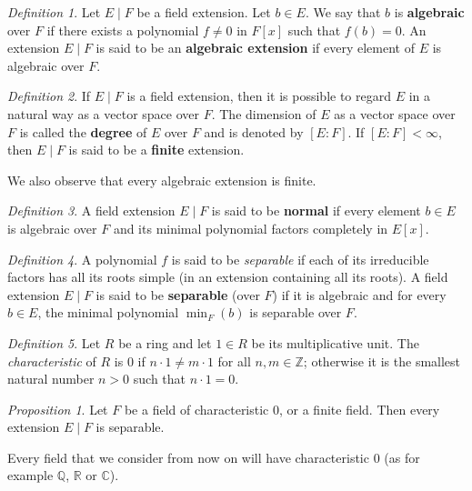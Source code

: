 \documentclass[11pt]{article}
\theoremstyle{plain}
\theoremstyle{definition}
\theoremstyle{remark}
\newtheorem*{definition*}{Definition}
\newtheorem*{proposition*}{Proposition}
\newcommand{\C}{\mathbb{C}}
\newcommand{\R}{\mathbb{R}}
\newcommand{\Q}{\mathbb{Q}}
\newcommand{\Z}{\mathbb{Z}}
\begin{document}
\begin{definition*}
Let $E\mid F$ be a field extension. Let $b \in E$. We say that $b$ is
\textbf{algebraic} over $F$ if there exists a polynomial $f \neq 0$ in
$F[x]$ such that $f(b) = 0$. An extension $E\mid F$ is said to be an
\textbf{algebraic extension} if every element of $E$ is algebraic over
$F$.
\end{definition*}

\begin{definition*}
If $E\mid F$ is a field extension, then it is possible to regard $E$ in
a natural way as a vector space over $F$. The dimension of $E$ as a
vector space over $F$ is called the \textbf{degree} of $E$ over $F$ and
is denoted by $[E : F]$. If $[E : F] < \infty$, then $E\mid F$ is said
to be a \textbf{finite} extension.
\end{definition*}

We also observe that every algebraic extension is finite.

\begin{definition*}
A field extension $E\mid F$ is said to be \textbf{normal} if every
element $b \in E$ is algebraic over $F$ and its minimal polynomial
factors completely in $E[x]$.
\end{definition*}

\begin{definition*}
A polynomial $f$ is said to be \emph{separable} if each of its
irreducible factors has all its roots simple (in an extension
containing all its roots). A field extension $E\mid F$ is said to be
\textbf{separable} (over $F$) if it is algebraic and for every
$b \in E$, the minimal polynomial $\min_{F}(b)$ is separable over $F$.
\end{definition*}

\begin{definition*}
Let $R$ be a ring and let $1 \in R$ be its multiplicative unit. The
\emph{characteristic} of $R$ is $0$ if $n \cdot 1 \neq m \cdot 1$ for
all $n, m \in \Z$; otherwise it is the smallest natural number $n > 0$
such that $n \cdot 1 = 0$.
\end{definition*}

\begin{proposition*}
Let $F$ be a field of characteristic $0$, or a finite field. Then
every extension $E\mid F$ is separable.
\end{proposition*}

Every field that we consider from now on will have characteristic $0$
(as for example $\Q$, $\R$ or $\C$).
\end{document}
